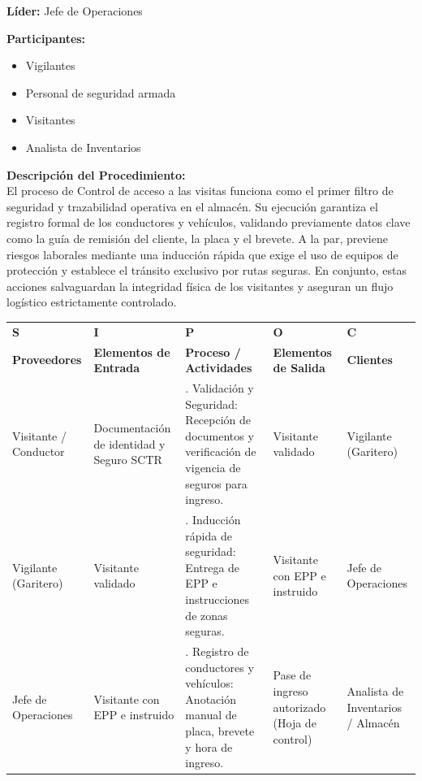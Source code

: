 \documentclass[11pt,letterpaper]{report}
\begin{document}
\textbf{Líder:} Jefe de Operaciones 

\textbf{Participantes:}
\begin{itemize}
  \item Vigilantes 
  \item Personal de seguridad armada
  \item Visitantes 
  \item Analista de Inventarios 
\end{itemize}

\textbf{Descripción del Procedimiento:} \\
El proceso de Control de acceso a las visitas funciona como el primer filtro de seguridad y trazabilidad operativa en el almacén. Su ejecución garantiza el registro formal de los conductores y vehículos, validando previamente datos clave como la guía de remisión del cliente, la placa y el brevete. A la par, previene riesgos laborales mediante una inducción rápida que exige el uso de equipos de protección y establece el tránsito exclusivo por rutas seguras. En conjunto, estas acciones salvaguardan la integridad física de los visitantes y aseguran un flujo logístico estrictamente controlado.

\vspace{1em}
\begin{center}
  \small
  \begin{tabularx}{\textwidth}{>{\raggedright\arraybackslash}p{} >{\raggedright\arraybackslash}p{} >{\raggedright\arraybackslash}X >{\raggedright\arraybackslash}p{} >{\raggedright\arraybackslash}p{}}
  \toprule
  \textbf{S} & \textbf{I} & \textbf{P} & \textbf{O} & \textbf{C} \\
  \textbf{Proveedores} & \textbf{Elementos de Entrada} & \textbf{Proceso / Actividades} & \textbf{Elementos de Salida} & \textbf{Clientes} \\
  \midrule
  Visitante / Conductor & Documentación de identidad y Seguro SCTR & 1. Validación y Seguridad: Recepción de documentos y verificación de vigencia de seguros para ingreso. & Visitante validado & Vigilante (Garitero) \\
  \midrule
  Vigilante (Garitero) & Visitante validado & 2. Inducción rápida de seguridad: Entrega de EPP e instrucciones de zonas seguras. & Visitante con EPP e instruido & Jefe de Operaciones \\
  \midrule
  Jefe de Operaciones & Visitante con EPP e instruido & 3. Registro de conductores y vehículos: Anotación manual de placa, brevete y hora de ingreso. & Pase de ingreso autorizado (Hoja de control) & Analista de Inventarios / Almacén \\
  \bottomrule
  \end{tabularx}
\end{center}
\vspace{1em}
\end{document}
